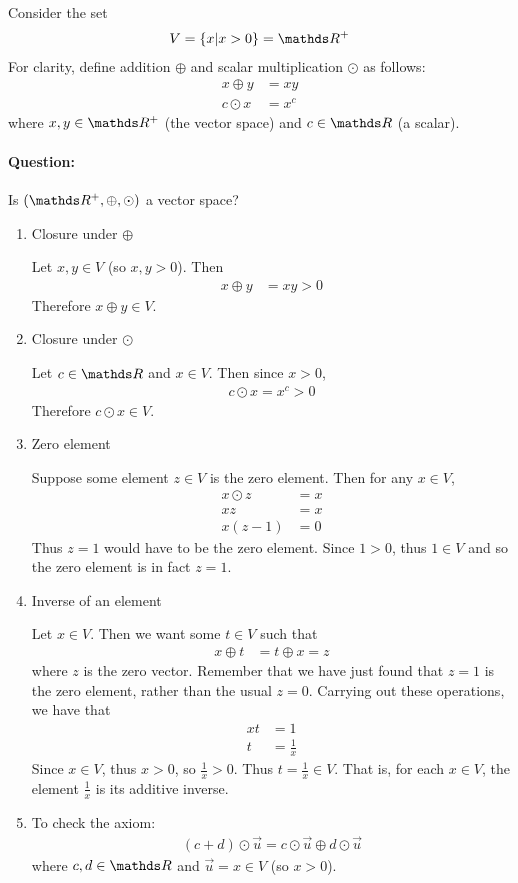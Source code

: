 \documentclass[11pt]{article}
\newcommand{\ques}{\paragraph{Question:}}
\newcommand{\vek}[1]{\vec{#1}}
\begin{document}
\vspace{1cm}

Consider the set
\begin{align*}
V = \left\{ x | x > 0 \right\} = \bbR^+
\end{align*}
For clarity, define addition $\oplus$ and scalar multiplication $\odot$ as follows:
\begin{align*}
x \oplus y &= xy
\\
c \odot x &= x^c
\end{align*}
where $x,y \in \bbR^+$ (the vector space) and $c \in \bbR$ (a scalar).

\ques Is $(\bbR^+, \oplus, \odot)$ a vector space?

\begin{enumerate}
\item{
Closure under $\oplus$

Let $x,y \in V$ (so $x,y > 0$). Then
\begin{align*}
x \oplus y &= xy > 0
\end{align*}
Therefore $x \oplus y \in V$.
}
\item{
Closure under $\odot$

Let $c \in \bbR$ and $x \in V$. Then since $x > 0$,
\begin{align*}
c \odot x = x^c > 0
\end{align*}
Therefore $c \odot x \in V$.
}
\item{
Zero element

Suppose some element $z \in V$ is the zero element. Then for any $x \in V$,
\begin{align*}
x \odot z &= x
\\
xz &= x
\\
x(z-1) &= 0
\end{align*}
Thus $z = 1$ would have to be the zero element. Since $1 > 0$, thus $1 \in V$ and so the zero element is in fact $z=1$.
}
\item{
Inverse of an element

Let $x \in V$. Then we want some $t \in V$ such that
\begin{align*}
x \oplus t &= t \oplus x = z
\end{align*}
where $z$ is the zero vector. Remember that we have just found that $z=1$ is the zero element, rather than the usual $z=0$. Carrying out these operations, we have that
\begin{align*}
xt &= 1
\\
t &= \frac{1}{x}
\end{align*}
Since $x \in V$, thus $x > 0$, so $\frac{1}{x} > 0$. Thus $t = \frac{1}{x} \in V$. That is, for each $x \in V$, the element $\frac{1}{x}$ is its additive inverse.
}
\item{
To check the axiom:
\begin{align*}
(c + d) \odot \vek{u} = c \odot \vek{u} \oplus d \odot \vek{u}
\end{align*}
where $c,d \in \bbR$ and $\vek{u} = x \in V$ (so $x > 0$).

}
\end{enumerate}
\end{document}
